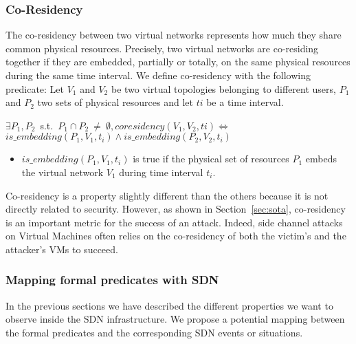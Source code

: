 \subsubsection{Co-Residency}
\label{sec:prop-cores}
The co-residency between two virtual networks represents how much they share common physical resources.
Precisely, two virtual networks are co-residing together if they are embedded, partially or totally, on the same physical resources during the same time interval.
We define co-residency with the following predicate:
Let $V_1$ and $V_2$ be two virtual topologies belonging to different users, $P_1$ and $P_2$ two sets of physical resources and let $ti$ be a time interval.
\begin{myformula}
$\exists P_1,P_2$~s.t.~$P_1 \cap P_2~\neq~\emptyset, coresidency(V_1,V_2,ti) \Leftrightarrow$\\ $is\_embedding(P_1,V_1,t_i) \wedge is\_embedding(P_2,V_2,t_i)$
\end{myformula}

\begin{itemize}
    \item $is\_embedding(P_1,V_1,t_i)$ is true if the physical set of resources $P_1$ embeds the virtual network $V_1$ during time interval $t_i$.
\end{itemize}

Co-residency is a property slightly different than the others because it is not directly related to security.
However, as shown in Section~\ref{sec:sota}, co-residency is an important metric for the success of an attack.
Indeed, side channel attacks on Virtual Machines often relies on the co-residency of both the victim's and the attacker's VMs to succeed.



\subsubsection{Mapping formal predicates with SDN}
\label{sec:mapping-model}
In the previous sections we have described the different properties we want to observe inside the SDN infrastructure.
We propose a potential mapping between the formal predicates and the corresponding SDN events or situations.


